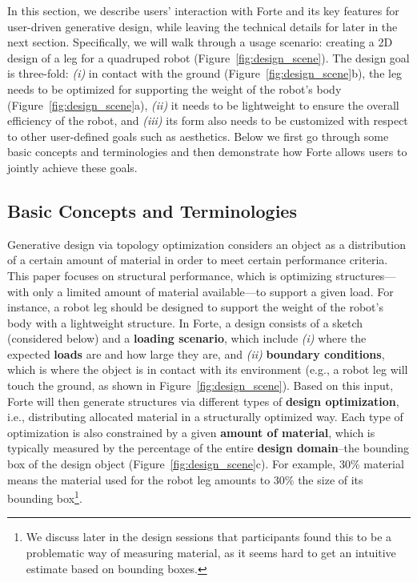 In this section, we describe users' interaction with Forte and its key features for user-driven generative design, while leaving the technical details for later in the next section. Specifically, we will walk through a usage scenario: creating a 2D design of a leg for a quadruped robot (Figure~\ref{fig:design_scene}). The design goal is three-fold: {\em (i)} in contact with the ground (Figure~\ref{fig:design_scene}b), the leg needs to be optimized for supporting the weight of the robot's body (Figure~\ref{fig:design_scene}a), {\em (ii)} it needs to be lightweight to ensure the overall efficiency of the robot, and {\em (iii)} its form also needs to be customized with respect to other user-defined goals such as aesthetics. Below we first go through some basic concepts and terminologies and then demonstrate how Forte allows users to jointly achieve these goals.

\subsection{Basic Concepts and Terminologies}
Generative design via topology optimization considers an object as a distribution of a certain amount of material in order to meet certain performance criteria. This paper focuses on structural performance, which is optimizing structures---with only a limited amount of material available---to support a given load. For instance, a robot leg should be designed to support the weight of the robot's body with a lightweight structure. In Forte, a design consists of a sketch (considered below) and a \textbf{loading scenario}, which include {\em(i)} where the expected \textbf{loads} are and how large they are, and {\em(ii)} \textbf{boundary conditions}, which is where the object is in contact with its environment (e.g., a robot leg will touch the ground, as shown in Figure~\ref{fig:design_scene}). Based on this input, Forte will then generate structures via different types of \textbf{design optimization}, i.e., distributing allocated material in a structurally optimized way. Each type of optimization is also constrained by a given \textbf{amount of material}, which is typically measured by the percentage of the entire \textbf{design domain}--the bounding box of the design object (Figure~\ref{fig:design_scene}c). For example, 30\% material means the material used for the robot leg amounts to 30\% the size of its bounding box\footnote{We discuss later in the design sessions that participants found this to be a problematic way of measuring material, as it seems hard to get an intuitive estimate based on bounding boxes.}.

